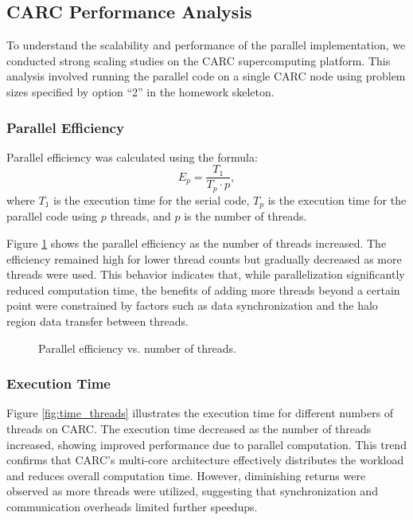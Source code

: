 \documentclass[12pt]{article}
\begin{document}
\subsection{CARC Performance Analysis}
To understand the scalability and performance of the parallel implementation, we conducted strong scaling studies on the CARC supercomputing platform. This analysis involved running the parallel code on a single CARC node using problem sizes specified by option “2” in the homework skeleton.

\subsubsection{Parallel Efficiency}
Parallel efficiency was calculated using the formula:
\[
E_p = \frac{T_1}{T_p \cdot p},
\]
where \( T_1 \) is the execution time for the serial code, \( T_p \) is the execution time for the parallel code using \( p \) threads, and \( p \) is the number of threads. 

Figure \ref{fig:efficiency_threads} shows the parallel efficiency as the number of threads increased. The efficiency remained high for lower thread counts but gradually decreased as more threads were used. This behavior indicates that, while parallelization significantly reduced computation time, the benefits of adding more threads beyond a certain point were constrained by factors such as data synchronization and the halo region data transfer between threads.

\begin{figure}[h!]
\centering
\caption{Parallel efficiency vs. number of threads.}
\label{fig:efficiency_threads}
\end{figure}

\FloatBarrier
\subsubsection{Execution Time}
Figure \ref{fig:time_threads} illustrates the execution time for different numbers of threads on CARC. The execution time decreased as the number of threads increased, showing improved performance due to parallel computation. This trend confirms that CARC's multi-core architecture effectively distributes the workload and reduces overall computation time. However, diminishing returns were observed as more threads were utilized, suggesting that synchronization and communication overheads limited further speedups.
\end{document}
